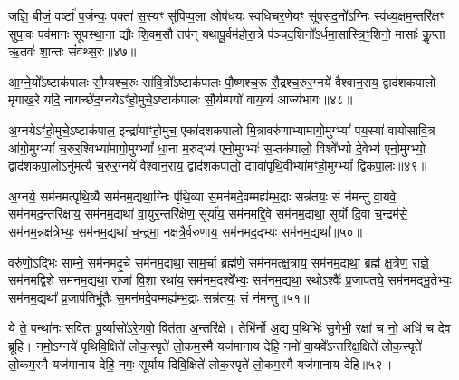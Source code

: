 जज्ञि॒ बीजं॒ वर्\mbox{}ष्टा॑ प॒र्जन्यः॒ पक्ता॑ स॒स्यꣳ सु॑पिप्प॒ला ओष॑धयः स्वधिचर॒णेयꣳ सू॑पसद॒नो᳚\-ऽग्निः स्व॑ध्य॒क्षम॒न्तरि॑क्षꣳ सुपा॒वः पव॑मानः सूपस्था॒ना द्यौः शि॒वम॒सौ तप॑न् यथापू॒र्वम॑होरा॒त्रे प॑ञ्चद॒शिनो᳚\-ऽर्धमा॒सास्त्रि॒ꣳ॒शिनो॒ मासाः᳚ कॢ॒प्ता ऋ॒तवः॑ शा॒न्तः सं॑वथ्स॒रः॥४७॥

{\anuvakamend[{जज्ञि॒ बीज॒मेक॑त्रिꣳशत्॥20॥}]}

आ॒ग्ने॒यो᳚\-ऽष्टाक॑पालः सौ॒म्यश्च॒रुः सा॑वि॒त्रो᳚\-ऽष्टाक॑पालः पौ॒ष्णश्च॒रू रौ॒द्रश्च॒रुर॒ग्नये॑ वैश्वान॒राय॒ द्वाद॑शकपालो मृगाख॒रे यदि॒ नागच्छे॑द॒ग्नये\-ऽꣳ॑हो॒मुचे॒\-ऽष्टाक॑पालः सौ॒र्यम्पयो॑ वाय॒व्य॑ आज्य॑भागः॥४८॥

{\anuvakamend[{आ॒ग्ने॒यश्चतु॑र्विꣳशतिः॥21॥}]}

अ॒ग्नये\-ऽꣳ॑हो॒मुचे॒\-ऽष्टाक॑पाल॒ इन्द्रा॑याꣳहो॒मुच॒ एका॑दशकपालो मि॒त्रावरु॑णाभ्यामागो॒मुग्\-भ्यां᳚ पय॒स्या॑ वायोसावि॒त्र आ॑गो॒मुग्\-भ्यां᳚ च॒रुर॒श्विभ्या॑मागो॒मुग्\-भ्यां᳚ धा॒ना म॒रुद्भ्य॑ एनो॒मुग्भ्यः॑ स॒प्तक॑पालो॒ विश्वे᳚भ्यो दे॒वेभ्य॑ एनो॒मुग्भ्यो॒ द्वाद॑शकपा॒लो\-ऽनु॑मत्यै च॒रुर॒ग्नये॑ वैश्वान॒राय॒ द्वाद॑शकपालो॒ द्यावा॑पृथि॒वीभ्या॑मꣳहो॒मुग्\-भ्यां᳚ द्विकपा॒लः॥४९॥

{\anuvakamend[{अ॒ग्नये\-ऽꣳ॑हो॒मुचे᳚ त्रि॒ꣳ॒शत्॥22॥}]}

अ॒ग्नये॒ सम॑नमत्पृथि॒व्यै सम॑नम॒द्यथा॒ग्निः पृ॑थि॒व्या स॒मन॑मदे॒वम्मह्य॑म्भ॒द्राः सन्न॑तयः॒ सं न॑मन्तु वा॒यवे॒ सम॑नमद॒न्तरि॑क्षाय॒ सम॑नम॒द्यथा॑ वा॒युर॒न्तरि॑क्षेण॒ सूर्या॑य॒ सम॑नमद्दि॒वे सम॑नम॒द्यथा॒ सूर्यो॑ दि॒वा च॒न्द्रम॑से॒ सम॑नम॒न्नक्ष॑त्रेभ्यः॒ सम॑नम॒द्यथा॑ च॒न्द्रमा॒ नक्ष॑त्रै॒र्वरु॑णाय॒ सम॑नमद॒द्भ्यः सम॑नम॒द्यथा᳚॥५०॥

वरु॑णो॒\-ऽद्भिः साम्ने॒ सम॑नमदृ॒चे सम॑नम॒द्यथा॒ साम॒र्चा ब्रह्म॑णे॒ सम॑नमत्क्ष॒त्राय॒ सम॑नम॒द्यथा॒ ब्रह्म॑ क्ष॒त्रेण॒ राज्ञे॒ सम॑नमद्वि॒शे सम॑नम॒द्यथा॒ राजा॑ वि॒शा रथा॑य॒ सम॑नम॒दश्वे᳚भ्यः॒ सम॑नम॒द्यथा॒ रथो\-ऽश्वैः᳚ प्र॒जाप॑तये॒ सम॑नमद्भू॒तेभ्यः॒ सम॑नम॒द्यथा᳚ प्र॒जाप॑तिर्भू॒तैः स॒मन॑मदे॒वम्मह्य॑म्भ॒द्राः सन्न॑तयः॒ सं न॑मन्तु॥५१॥

{\anuvakamend[{अ॒द्भ्यः सम॑नम॒द्यथा॒ मह्यं॑ च॒त्वारि॑ च॥23॥}]}

ये ते॒ पन्था॑नः सवितः पू॒र्व्यासो॑\-ऽरे॒णवो॒ वित॑ता अ॒न्तरि॑क्षे। तेभि॑र्नो अ॒द्य प॒थिभिः॑ सु॒गेभी॒ रक्षा॑ च नो॒ अधि॑ च देव ब्रूहि। नमो॒\-ऽग्नये॑ पृथिवि॒क्षिते॑ लोक॒स्पृते॑ लो॒कम॒स्मै यज॑मानाय देहि॒ नमो॑ वा॒यवे᳚\-ऽन्तरिक्ष॒क्षिते॑ लोक॒स्पृते॑ लो॒कम॒स्मै यज॑मानाय देहि॒ नमः॒ सूर्या॑य दिवि॒क्षिते॑ लोक॒स्पृते॑ लो॒कम॒स्मै यज॑मानाय देहि॥५२॥

{\anuvakamend[{ये ते॒ चतु॑श्चत्वारिꣳशत्॥24॥}]}

